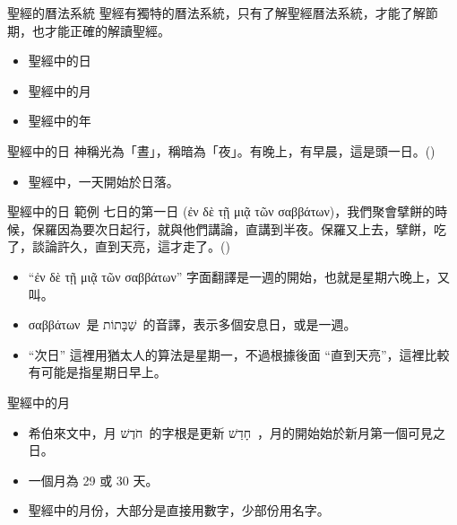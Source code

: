 \documentclass{beamer}
\newcommand{\parvspace}{\par\vspace{0.5em}}
\begin{document}
\begin{frame}{聖經的曆法系統}
  聖經有獨特的曆法系統，只有了解聖經曆法系統，才能了解節期，也才能正確的解讀聖經。\parvspace
  \begin{itemize}
    \item 聖經中的日
    \item 聖經中的月
    \item 聖經中的年
  \end{itemize}
\end{frame}

\begin{frame}{聖經中的日}
  神稱光為「晝」，稱暗為「夜」。\alert{有晚上，有早晨}，這是頭一日。()\parvspace
  \begin{itemize}
    \item 聖經中，一天開始於日落\parencite{JewishDay}。
  \end{itemize}
\end{frame}

\begin{frame}{聖經中的日 \textemdash 範例}
  七日的第一日 (\textgreek{ἐν δὲ τῇ μιᾷ τῶν σαββάτων})，我們聚會擘餅的時候，保羅因為要次日起行，就與他們講論，直講到半夜。\textellipsis{}保羅又上去，擘餅，吃了，談論許久，直到天亮，這才走了。()\parvspace
  \begin{itemize}
    \item “\textgreek{ἐν δὲ τῇ μιᾷ τῶν σαββάτων}” 字面翻譯是\alert{一週的開始}，也就是星期六晚上，又叫\textcite{MotzaeiShabbat}。
    \item \textgreek{σαββάτων}\ 是 \texthebrew{שַׁבָּתוֹת}\ 的音譯，表示多個安息日，或是一週。
    \item “次日” 這裡用猶太人的算法是星期一，不過根據後面 “直到天亮”，這裡比較有可能是指星期日早上。
  \end{itemize}
\end{frame}

\begin{frame}{聖經中的月}
  \begin{itemize}
    \item 希伯來文中，月 \texthebrew{חֹדֶשׁ}\ 的字根是更新 \texthebrew{חָדַשׁ}\ ，月的開始始於\alert{新月第一個可見之日}。
    \item 一個月為 \alert{29 或 30 天}。
    \item 聖經中的月份，大部分是直接用數字，少部份用名字。
  \end{itemize}
\end{frame}
\end{document}
